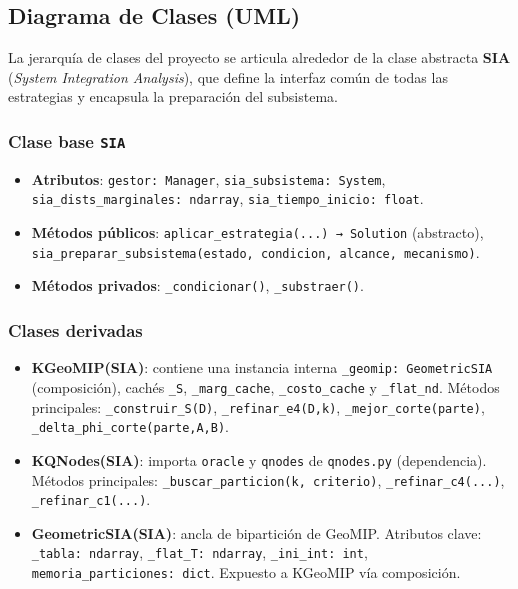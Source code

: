 \subsection{Diagrama de Clases (UML)}

La jerarquía de clases del proyecto se articula alrededor de la clase abstracta
\textbf{SIA} (\textit{System Integration Analysis}), que define la interfaz común
de todas las estrategias y encapsula la preparación del subsistema.

\subsubsection*{Clase base \texttt{SIA}}

\begin{itemize}
  \item \textbf{Atributos}: \texttt{gestor: Manager}, \texttt{sia\_subsistema: System},
        \texttt{sia\_dists\_marginales: ndarray}, \texttt{sia\_tiempo\_inicio: float}.
  \item \textbf{Métodos públicos}: \texttt{aplicar\_estrategia(...) → Solution} (abstracto),
        \texttt{sia\_preparar\_subsistema(estado, condicion, alcance, mecanismo)}.
  \item \textbf{Métodos privados}: \texttt{\_condicionar()}, \texttt{\_substraer()}.
\end{itemize}

\subsubsection*{Clases derivadas}

\begin{itemize}
  \item \textbf{KGeoMIP(SIA)}: contiene una instancia interna \texttt{\_geomip:
        GeometricSIA} (composición), cachés \texttt{\_S}, \texttt{\_marg\_cache},
        \texttt{\_costo\_cache} y \texttt{\_flat\_nd}. Métodos principales:
        \texttt{\_construir\_S(D)}, \texttt{\_refinar\_e4(D,k)},
        \texttt{\_mejor\_corte(parte)}, \texttt{\_delta\_phi\_corte(parte,A,B)}.

  \item \textbf{KQNodes(SIA)}: importa \texttt{oracle} y \texttt{qnodes} de
        \texttt{qnodes.py} (dependencia). Métodos principales:
        \texttt{\_buscar\_particion(k, criterio)}, \texttt{\_refinar\_c4(...)},
        \texttt{\_refinar\_c1(...)}.

  \item \textbf{GeometricSIA(SIA)}: ancla de bipartición de GeoMIP. Atributos clave:
        \texttt{\_tabla: ndarray}, \texttt{\_flat\_T: ndarray}, \texttt{\_ini\_int: int},
        \texttt{memoria\_particiones: dict}. Expuesto a KGeoMIP vía composición.
\end{itemize}

